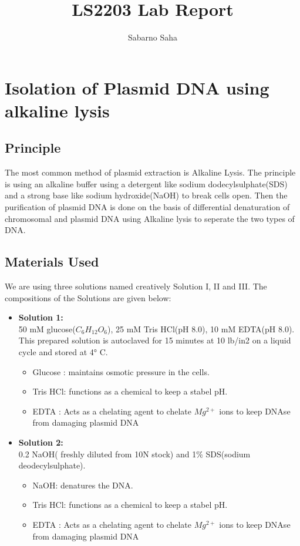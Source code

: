 \documentclass[a4paper]{article}
\title{LS2203 Lab Report}
\author{Sabarno Saha}
\begin{document}
\maketitle
\section{Isolation of Plasmid DNA using alkaline lysis}
\subsection{Principle}
The most common method of plasmid extraction is Alkaline Lysis. The principle is using an alkaline buffer 
using a detergent like sodium dodecylsulphate(SDS) and a strong base like sodium hydroxide(NaOH) to break 
cells open. Then the purification of plasmid DNA is done on the basis of differential denaturation of 
chromosomal and plasmid DNA using Alkaline lysis to seperate the two types of DNA.

\subsection{Materials Used}
We are using three solutions named creatively Solution I, II and III. The compositions of the Solutions 
are given below:
\begin{itemize}
    \item \textbf{Solution 1: }\\ 
         50 mM glucose($C_6H_{12}O_6$), 25 mM Tris HCl(pH 8.0), 10 mM EDTA(pH 8.0). This prepared solution 
         is autoclaved for 15 minutes at 10 lb/in2 on a liquid cycle and stored at 4° C.
         \begin{itemize}
           \item Glucose : maintains osmotic pressure in the cells.
           \item Tris HCl: functions as a chemical to keep a stabel pH.
            \item  EDTA : Acts as a chelating agent to chelate $Mg^{2+}$ ions to keep DNAse from damaging 
                plasmid DNA
         \end{itemize}
    \item \textbf{Solution 2: }\\ 
        0.2 NaOH( freshly diluted from 10N stock) and 1\% SDS(sodium deodecylsulphate).
         \begin{itemize}
           \item NaOH: denatures the DNA.
            \item Tris HCl: functions as a chemical to keep a stabel pH.
            \item  EDTA : Acts as a chelating agent to chelate $Mg^{2+}$ ions to keep DNAse from damaging 
                plasmid DNA
         \end{itemize}
\end{itemize}


    
\end{document}
